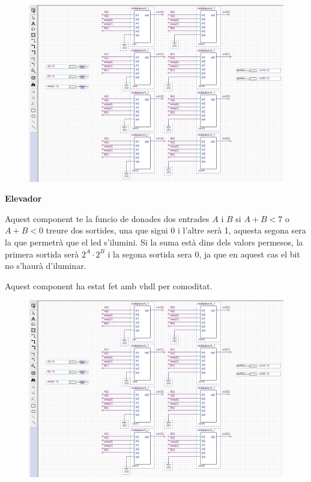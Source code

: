 \documentclass[12pt, a4papre]{article}
\begin{document}
		\begin{center}
	\begin{figure}[H]
		\begin{center}
		\includegraphics[width=150mm]{selectormult.jpeg}
		\end{center}
	\end{figure}
	\end{center}
	
	\textbf{\large{Elevador}}
	
	Aquest component te la funcio de donades dos entrades $A$ i $B$ si $A + B < 7$ o $A + B  < 0$ treure dos sortides, una que sigui 0 i l'altre serà 1, aquesta segona sera la que permetrà que el led s'ilumini. Si la suma està dins dels valors permesos, la primera sortida serà $2^A\cdot2^B$ i la segona sortida sera 0, ja que en aquest cas el bit no s'haurà d'iluminar.
	
	Aquest component ha estat fet amb vhdl per comoditat.
	
	\begin{center}
	\begin{figure}[H]
		\begin{center}
		\includegraphics[width=150mm]{selectormult.jpeg}
		\end{center}
	\end{figure}
	\end{center}
	
\end{document}
